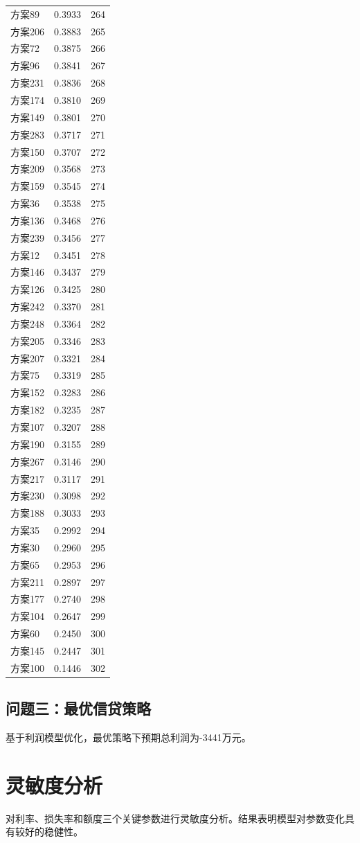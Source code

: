 \documentclass[12pt,a4paper]{article}
\begin{document}
\begin{table}[H]
\begin{tabular}{lcc}
    方案89 & 0.3933 & 264 \\
    方案206 & 0.3883 & 265 \\
    方案72 & 0.3875 & 266 \\
    方案96 & 0.3841 & 267 \\
    方案231 & 0.3836 & 268 \\
    方案174 & 0.3810 & 269 \\
    方案149 & 0.3801 & 270 \\
    方案283 & 0.3717 & 271 \\
    方案150 & 0.3707 & 272 \\
    方案209 & 0.3568 & 273 \\
    方案159 & 0.3545 & 274 \\
    方案36 & 0.3538 & 275 \\
    方案136 & 0.3468 & 276 \\
    方案239 & 0.3456 & 277 \\
    方案12 & 0.3451 & 278 \\
    方案146 & 0.3437 & 279 \\
    方案126 & 0.3425 & 280 \\
    方案242 & 0.3370 & 281 \\
    方案248 & 0.3364 & 282 \\
    方案205 & 0.3346 & 283 \\
    方案207 & 0.3321 & 284 \\
    方案75 & 0.3319 & 285 \\
    方案152 & 0.3283 & 286 \\
    方案182 & 0.3235 & 287 \\
    方案107 & 0.3207 & 288 \\
    方案190 & 0.3155 & 289 \\
    方案267 & 0.3146 & 290 \\
    方案217 & 0.3117 & 291 \\
    方案230 & 0.3098 & 292 \\
    方案188 & 0.3033 & 293 \\
    方案35 & 0.2992 & 294 \\
    方案30 & 0.2960 & 295 \\
    方案65 & 0.2953 & 296 \\
    方案211 & 0.2897 & 297 \\
    方案177 & 0.2740 & 298 \\
    方案104 & 0.2647 & 299 \\
    方案60 & 0.2450 & 300 \\
    方案145 & 0.2447 & 301 \\
    方案100 & 0.1446 & 302 \\
    \bottomrule
  \end{tabular}
  \label{tab:topsis}
\end{table}


\subsection{问题三：最优信贷策略}


基于利润模型优化，最优策略下预期总利润为-3441万元。


\section{灵敏度分析}


对利率、损失率和额度三个关键参数进行灵敏度分析。结果表明模型对参数变化具有较好的稳健性。
\end{document}
